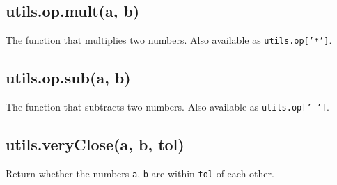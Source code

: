 \documentclass{article}
\begin{document}
    \subsection*{utils.op.mult(a, b)}
    The function that multiplies two numbers. Also available as \texttt{utils.op['*']}.


    \subsection*{utils.op.sub(a, b)}
    The function that subtracts two numbers. Also available as \texttt{utils.op['-']}.


    \subsection*{utils.veryClose(a, b, tol)}
    Return whether the numbers \texttt{a}, \texttt{b} are within \texttt{tol} of each other.
\end{document}

